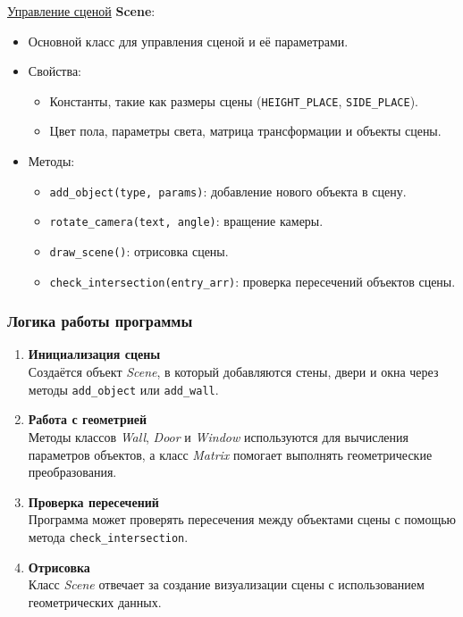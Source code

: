 \underline{Управление сценой}
\textbf{Scene}:
\begin{itemize}
    \item Основной класс для управления сценой и её параметрами.
    \item Свойства:
    \begin{itemize}
        \item Константы, такие как размеры сцены (\verb|HEIGHT_PLACE|, \verb|SIDE_PLACE|).
        \item Цвет пола, параметры света, матрица трансформации и объекты сцены.
    \end{itemize}
    \item Методы:
    \begin{itemize}
        \item \verb|add_object(type, params)|: добавление нового объекта в сцену.
        \item \verb|rotate_camera(text, angle)|: вращение камеры.
        \item \verb|draw_scene()|: отрисовка сцены.
        \item \verb|check_intersection(entry_arr)|: проверка пересечений объектов сцены.
    \end{itemize}
\end{itemize}

\subsubsection{Логика работы программы}
\begin{enumerate}
    \item \textbf{Инициализация сцены}\\
    Создаётся объект \textit{Scene}, в который добавляются стены, двери и окна через методы \verb|add_object| или \verb|add_wall|.
    \item \textbf{Работа с геометрией}\\
    Методы классов \textit{Wall}, \textit{Door} и \textit{Window} используются для вычисления параметров объектов, а класс \textit{Matrix} помогает выполнять геометрические преобразования.
    \item \textbf{Проверка пересечений}\\
    Программа может проверять пересечения между объектами сцены с помощью метода \verb|check_intersection|.
    \item \textbf{Отрисовка}\\
    Класс \textit{Scene} отвечает за создание визуализации сцены с использованием геометрических данных.
\end{enumerate}



